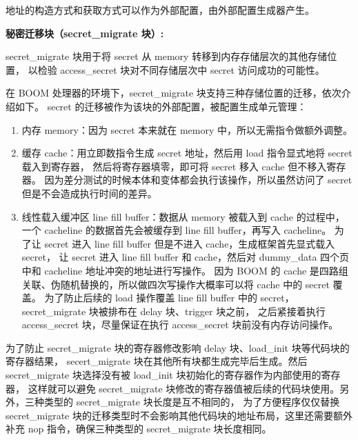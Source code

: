 地址的构造方式和获取方式可以作为外部配置，由外部配置生成器产生。\par

\textbf{秘密迁移块（secret\_migrate 块）:}\par
secret\_migrate 块用于将 secret 从 memory 转移到内存存储层次的其他存储位置，
以检验 access\_secret 块对不同存储层次中 secret 访问成功的可能性。\par

在 BOOM 处理器的环境下，secret\_migrate 块支持三种存储位置的迁移，依次介绍如下。
secret 的迁移被作为该块的外部配置，被配置生成单元管理：
\begin{enumerate}
    \item 内存 memory：因为 secret 本来就在 memory 中，所以无需指令做额外调整。\par
    \item 缓存 cache：用立即数指令生成 secret 地址，然后用 load 指令显式地将 secret 载入到寄存器，
然后将寄存器填零，即可将 secret 移入 cache 但不移入寄存器。
因为差分测试的时候本体和变体都会执行该操作，所以虽然访问了 secret 但是不会造成执行时间的差异。\par
    \item 线性载入缓冲区 line fill buffer：数据从 memory 被载入到 cache 的过程中，
    一个 cacheline 的数据首先会被缓存到 line fill buffer，再写入 cacheline。
    为了让 secret 进入 line fill buffer 但是不进入 cache，生成框架首先显式载入 secret，
    让 secret 进入 line fill buffer 和 cache，然后对 dummy\_data 四个页中和 cacheline 地址冲突的地址进行写操作。
    因为 BOOM 的 cache 是四路组关联、伪随机替换的，所以做四次写操作大概率可以将 cache 中的 secret 覆盖。
    为了防止后续的 load 操作覆盖 line fill buffer 中的 secret，secret\_migrate 块被排布在 delay 块、trigger 块之前，
    之后紧接着执行 access\_secret 块，尽量保证在执行 access\_secret 块前没有内存访问操作。\par
\end{enumerate}

为了防止 secret\_migrate 块的寄存器修改影响 delay 块、load\_init 块等代码块的寄存器结果，
secert\_migrate 块在其他所有块都生成完毕后生成。然后 secret\_migrate 块选择没有被 load\_init 块初始化的寄存器作为内部使用的寄存器，
这样就可以避免 secret\_migrate 块修改的寄存器值被后续的代码块使用。另外，三种类型的 secret\_migrate 块长度是互不相同的，
为了方便程序仅仅替换 secret\_migrate 块的迁移类型时不会影响其他代码块的地址布局，这里还需要额外补充 nop 指令，确保三种类型的 secret\_migrate 块长度相同。\par

